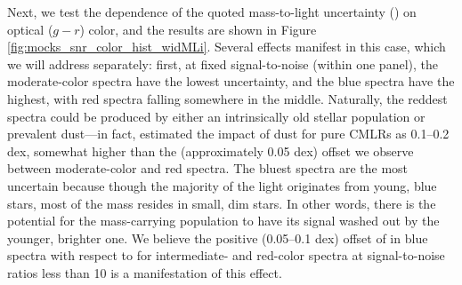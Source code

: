 Next, we test the dependence of the quoted mass-to-light uncertainty () on optical ($g-r$) color, and the results are shown in Figure \ref{fig:mocks_snr_color_hist_widMLi}. Several effects manifest in this case, which we will address separately: first, at fixed signal-to-noise (within one panel), the moderate-color spectra have the lowest uncertainty, and the blue spectra have the highest, with red spectra falling somewhere in the middle. Naturally, the reddest spectra could be produced by either an intrinsically old stellar population or prevalent dust---in fact, \citet{bell_03} estimated the impact of dust for pure CMLRs as 0.1--0.2 dex, somewhat higher than the (approximately 0.05 dex) offset we observe between moderate-color and red spectra. The bluest spectra are the most uncertain because though the majority of the light originates from young, blue stars, most of the mass resides in small, dim stars. In other words, there is the potential for the mass-carrying population to have its signal washed out by the younger, brighter one. We believe the positive (0.05--0.1 dex) offset of  in blue spectra with respect to  for intermediate- and red-color spectra at signal-to-noise ratios less than 10 is a manifestation of this effect.

